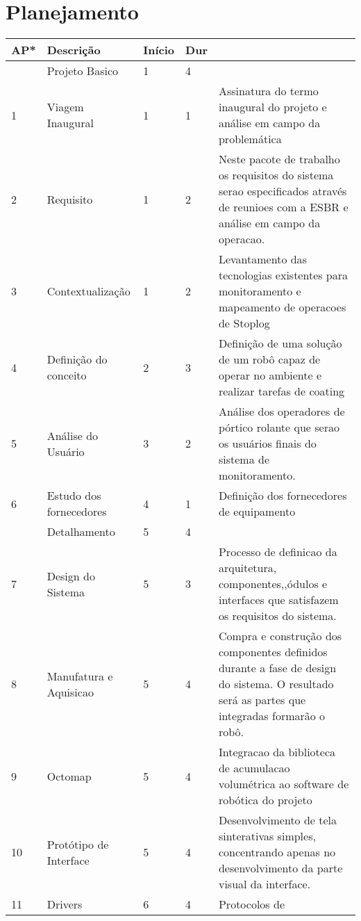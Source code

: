 \section{Planejamento}



\begin{longtable}{ | l | p{4cm} | l | l | p{5cm} | }
\hline
    \rowcolor{Gray}
	AP* & Descrição & Início & Dur &  \  \\ \hline
	 & Projeto Basico & 1 & 4 & \ \\ \hline
	1 & Viagem Inaugural & 1 & 1 &  Assinatura do termo inaugural do projeto e
	análise em campo da problemática \\ \hline 
	2 & Requisito & 1 & 2 & Neste pacote de trabalho os requisitos do sistema serao
	especificados através de reunioes com a ESBR e análise em campo da operacao.    \\ \hline 
	3 & Contextualização & 1 & 2 & Levantamento das tecnologias existentes para monitoramento e mapeamento de operacoes de Stoplog \\ \hline
	4 & Definição do conceito & 2 & 3 & Definição de uma solução de um robô capaz
	 de operar no ambiente e realizar tarefas de coating   \\ \hline 
	5 & Análise do Usuário & 3 & 2 & Análise dos operadores de pórtico rolante que
	 serao os usuários finais do sistema de monitoramento.  \\ \hline 
	6 & Estudo dos \newline fornecedores & 4 & 1 & Definição dos fornecedores
	de equipamento \\ \hline 
	\rowcolor{Gray}
	  & Detalhamento & 5 & 4 &  \  \\ \hline
	7 & Design do Sistema & 5 & 3 & Processo de definicao da arquitetura,
	componentes,,ódulos e interfaces que satisfazem os requisitos do sistema. \\
	\hline 8 & Manufatura \newline e Aquisicao & 5 & 4 & Compra e construção dos
	componentes definidos durante a fase de design do sistema. O resultado será as partes que integradas formarão o robô.  \\ \hline 9 & Octomap & 5 & 4
	& Integracao da biblioteca de acumulacao volumétrica ao software de robótica
	do projeto \\ \hline 10 & Protótipo de Interface & 5 & 4 & Desenvolvimento de
	tela sinterativas simples, concentrando apenas no desenvolvimento da parte
	visual da interface. \\ \hline 11 & Drivers & 6 & 4 & Protocolos de

\end{longtable}
